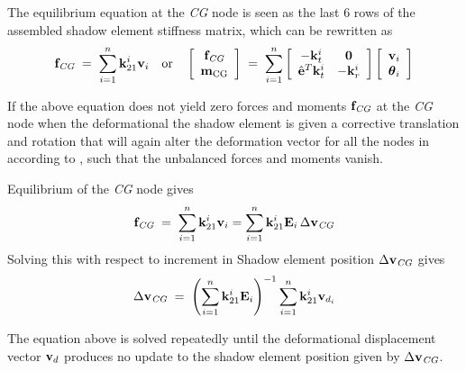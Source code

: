 The equilibrium equation at the \textit{CG} node is seen as the last 6 rows
of the assembled shadow element stiffness matrix, which can be rewritten as
%
\begin{equation}
{\bf f}_\textit{CG} \;=\; \sum_{i=1}^n{\bf k}^i_{21} {\bf v}_i
\quad\text{or}\quad
\left[\begin{array}{c}
{\bf f}_\textit{CG} \\ {\bf m}_\text{CG} \\
\end{array}\right]
\;=\; \sum_{i=1}^n
\left[\begin{array}{cc}
-{\bf k}^i_t               &  {\bf 0}     \\
 \hat{\bf e}^T {\bf k}^i_t & -{\bf k}^i_r \\
\end{array}\right]
\left[\begin{array}{c}
{\bf v}_i \\ {\boldsymbol{\theta}}_i \\
\end{array}\right]
\end{equation}

If the above equation does not yield zero forces and moments
${\bf f}_\textit{CG}$ at the \textit{CG} node when the deformational
\iftoggle{publicedition}{%
displacement vector is used,
}{%
displacement vector ${\mf v}_d$ of \eqnref{eqSC:supelDefDisp} is used,
}
the shadow element is given a corrective translation and rotation that will
again alter the deformation vector for all the nodes in according to
, such that the unbalanced forces and moments vanish.

Equilibrium of the \textit{CG} node gives
%
\begin{equation}
{\bf f}_\textit{CG} \;=\;
\sum_{i=1}^n{\bf k}^i_{21}{\bf v}_i =
\sum_{i=1}^n{\bf k}^i_{21}{\bf E}_i\,\Delta{\bf v}_\textit{CG}
\end{equation}
%
Solving this with respect to increment in Shadow element position
$\Delta{\bf v}_\textit{CG}$ gives
%
\begin{equation}
\Delta{\bf v}_\textit{CG} \;=\;
\left(\sum_{i=1}^n{\bf k}^i_{21}{\bf E}_i\right)^{-1}
\sum_{i=1}^n{\bf k}^i_{21}{\bf v}_{d_i}
\label{eq:refSysMeth2}
\end{equation}

The equation above is solved repeatedly until the deformational displacement
vector ${\mf v}_d$ produces no update to the shadow element position given by
$\Delta{\bf v}_\textit{CG}$.
